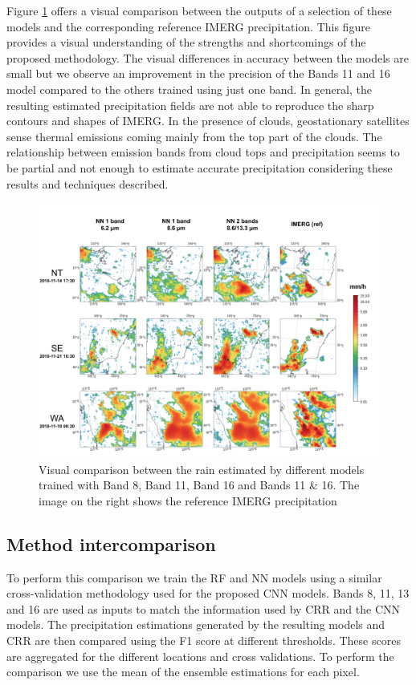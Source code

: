 \documentclass[3p,times]{elsarticle}
\begin{document}
Figure \ref{output_cmp} offers a visual comparison between the outputs of a selection of these models and the corresponding reference IMERG precipitation. This figure provides a visual understanding of the strengths and shortcomings of the proposed methodology. The visual differences in accuracy between the models are small but we observe an improvement in the precision of the Bands 11 and 16 model compared to the others trained using just one band. In general, the resulting estimated precipitation fields are not able to reproduce the sharp contours and shapes of IMERG. In the presence of clouds, geostationary satellites sense thermal emissions coming mainly from the top part of the clouds. The relationship between emission bands from cloud tops and precipitation seems to be partial and not enough to estimate accurate precipitation considering these results and techniques described.

\begin{figure}%
    \includegraphics[width=14cm]{output_cmp.png}
	\caption{Visual comparison between the rain estimated by different models trained with Band 8, Band 11, Band 16 and Bands 11 \& 16. The image on the right shows the reference IMERG precipitation}%
    \label{output_cmp}%
\end{figure}

\subsection{Method intercomparison}

To perform this comparison we train the RF and NN models using a similar cross-validation methodology used for the proposed CNN models. Bands 8, 11, 13 and 16 are used as inputs to match the information used by CRR and the CNN models. The precipitation estimations generated by the resulting models and CRR are then compared using the F1 score at different thresholds. These scores are aggregated for the different locations and cross validations. To perform the comparison we use the mean of the ensemble estimations for each pixel.
\end{document}
